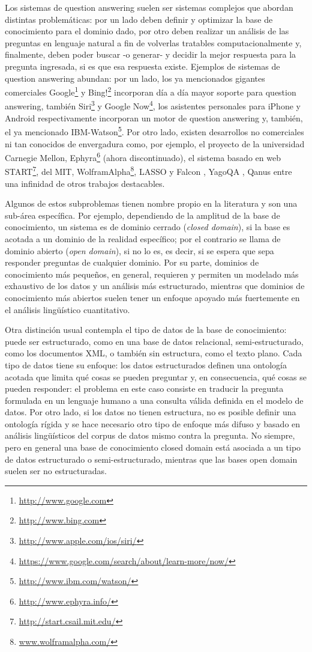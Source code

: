 Los sistemas de question answering suelen ser sistemas complejos que abordan distintas problemáticas: por un lado deben definir y optimizar la base de conocimiento para el dominio dado, por otro deben realizar un análisis de las preguntas en lenguaje natural a fin de volverlas tratables computacionalmente y, finalmente, deben poder buscar -o generar- y decidir la mejor respuesta para la pregunta ingresada, si es que esa respuesta existe. Ejemplos de sistemas de question answering abundan: por un lado, los ya mencionados gigantes comerciales Google\footnote{\url{http://www.google.com}} y Bing!\footnote{\url{http://www.bing.com}} incorporan día a día mayor soporte para question answering, también Siri\footnote{\url{http://www.apple.com/ios/siri/}} y Google Now\footnote{\url{https://www.google.com/search/about/learn-more/now/}}, los asistentes personales para iPhone y Android respectivamente incorporan un motor de question answering y, también, el ya mencionado IBM-Watson\footnote{\url{http://www.ibm.com/watson/}}. Por otro lado, existen desarrollos no comerciales ni tan conocidos de envergadura como, por ejemplo, el proyecto de la universidad Carnegie Mellon,  Ephyra\footnote{\url{http://www.ephyra.info/}}\cite{EPHYRA1} (ahora discontinuado), el sistema basado en web START\footnote{\url{http://start.csail.mit.edu/}}, del MIT, WolframAlpha\footnote{\url{www.wolframalpha.com/}}, LASSO y Falcon \cite{QA1}\cite{QA3}, YagoQA \cite{YAGO-QA1}, Qanus \cite{QANUS1} entre una infinidad de otros trabajos destacables.

Algunos de estos subproblemas tienen nombre propio en la literatura y son una sub-área específica. Por ejemplo, dependiendo de la amplitud de la base de conocimiento, un sistema es de dominio cerrado (\textit{closed domain}), si la base es acotada a un dominio de la realidad específico; por el contrario se llama de dominio abierto (\textit{open domain}), si no lo es, es decir, si se espera que sepa responder preguntas de cualquier dominio. Por su parte, dominios de conocimiento más pequeños, en general, requieren y permiten un modelado más exhaustivo
de los datos y un análisis más estructurado, mientras que dominios de conocimiento más abiertos suelen
tener un enfoque apoyado más fuertemente en el análisis lingüístico cuantitativo.

Otra distinción usual contempla el tipo de datos de la base de conocimiento:  puede ser estructurado, como en una base de datos
relacional, semi-estructurado, como los documentos XML, o también sin estructura, como el texto plano. Cada tipo de datos tiene su enfoque:
los datos estructurados definen una ontología acotada que limita qué cosas se pueden preguntar y, en consecuencia, qué cosas se pueden responder: el problema en este caso consiste en traducir la pregunta formulada en un lenguaje humano a una consulta válida definida en el modelo de datos. Por otro lado, si los datos no tienen estructura, no es posible definir una ontología rígida y se hace necesario otro tipo de enfoque más difuso y basado en análisis lingüísticos del corpus de datos mismo contra la pregunta. No siempre,  pero en general una base de conocimiento closed domain está asociada a un tipo de datos estructurado o semi-estructurado, mientras que las bases open domain suelen ser no estructuradas.

